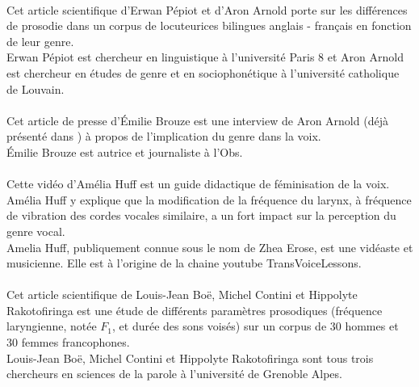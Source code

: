 \parencite{Pep20} \\
      Cet article scientifique d'Erwan Pépiot et d'Aron Arnold porte sur les différences de prosodie dans un corpus de locuteurices bilingues anglais - français en fonction de leur genre.\\
      Erwan Pépiot est chercheur en linguistique à l'université Paris 8 et Aron Arnold est chercheur en études de genre et en sociophonétique à l'université catholique de Louvain.\\

\parencite{Bro18} \\
      Cet article de presse d'Émilie Brouze est une interview de Aron Arnold (déjà présenté dans \parencite{Pep20}) à propos de l'implication du genre dans la voix.\\
      Émilie Brouze est autrice et journaliste à l'Obs.\\


\parencite{video} \\
      Cette vidéo d'Amélia Huff est un guide didactique de féminisation de la voix. Amélia Huff y explique que la modification de la fréquence du larynx, à fréquence de vibration des cordes vocales similaire, a un fort impact sur la perception du genre vocal.\\
      Amelia Huff, publiquement connue sous le nom de Zhea Erose, est une vidéaste et musicienne. Elle est à l'origine de la chaine youtube TransVoiceLessons.\\

\parencite{Boe75} \\
      Cet article scientifique de Louis-Jean Boë, Michel Contini et Hippolyte Rakotofiringa est une étude de différents paramètres prosodiques (fréquence laryngienne, notée $F_1$, et durée des sons voisés) sur un corpus de 30 hommes et 30 femmes francophones.\\
      Louis-Jean Boë, Michel Contini et Hippolyte Rakotofiringa sont tous trois chercheurs en sciences de la parole à l'université de Grenoble Alpes.\\

